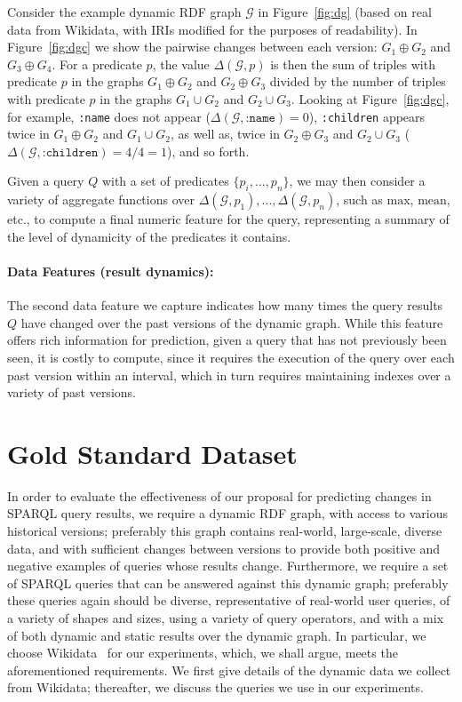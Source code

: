\documentclass[runningheads]{llncs}
\begin{document}
\begin{example}
Consider the example dynamic RDF graph $\mathcal{G}$ in Figure~\ref{fig:dg} (based on real data from Wikidata, with IRIs modified for the purposes of readability). In Figure~\ref{fig:dgc} we show the pairwise changes between each version: $G_1 \oplus G_2$ and $G_3 \oplus G_4$. For a predicate $p$, the value $\Delta(\mathcal{G},p)$ is then the sum of triples with predicate $p$ in the graphs $G_1 \oplus G_2$ and $G_2 \oplus G_3$ divided by the number of triples with predicate $p$ in the graphs $G_1 \cup G_2$ and $G_2 \cup G_3$. Looking at Figure~\ref{fig:dgc}, for example, \texttt{:name} does not appear ($\Delta(\mathcal{G},\texttt{:name})=0$), \texttt{:children} appears twice in $G_1 \oplus G_2$ and $G_1 \cup G_2$, as well as, twice in $G_2 \oplus G_3$ and $G_2 \cup G_3$ ($\Delta(\mathcal{G},\texttt{:children})=4/4=1$), and so forth.
\end{example}

Given a query $Q$ with a set of predicates $\{ p_i, ..., p_n \}$, we may then consider a variety of aggregate functions over $\Delta(\mathcal{G},p_1), ..., \Delta(\mathcal{G},p_n)$, such as $\mathrm{max}$, $\mathrm{mean}$, etc., to compute a final numeric feature for the query, representing a summary of the level of dynamicity of the predicates it contains.

\paragraph{Data Features (result dynamics):} The second data feature we capture indicates how many times the query results $Q$ have changed over the past versions of the dynamic graph. While this feature offers rich information for prediction, given a query that has not previously been seen, it is costly to compute, since it requires the execution of the query over each past version within an interval, which in turn requires maintaining indexes over a variety of past versions.

\section{Gold Standard Dataset}
\label{sec:data}

In order to evaluate the effectiveness of our proposal for predicting changes in SPARQL query results, we require a dynamic RDF graph, with access to various historical versions; preferably this graph contains real-world, large-scale, diverse data, and with sufficient changes between versions to provide both positive and negative examples of queries whose results change. Furthermore, we require a set of SPARQL queries that can be answered against this dynamic graph; preferably these queries again should be diverse, representative of real-world user queries, of a variety of shapes and sizes, using a variety of query operators, and with a mix of both dynamic and static results over the dynamic graph. In particular, we choose Wikidata~\cite{VrandecicK14} for our experiments, which, we shall argue, meets the aforementioned requirements. We first give details of the dynamic data we collect from Wikidata; thereafter, we discuss the queries we use in our experiments.
\end{document}
